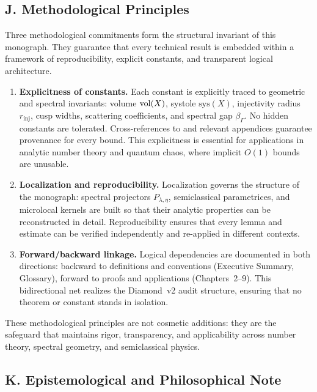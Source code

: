 \subsection*{J. Methodological Principles}

Three methodological commitments form the structural invariant of this monograph.
They guarantee that every technical result is embedded within a framework of
reproducibility, explicit constants, and transparent logical architecture.

\begin{enumerate}[label=\arabic*.]
  \item \textbf{Explicitness of constants.}
  Each constant is explicitly traced to geometric and spectral invariants:
  volume $\operatorname{vol}(X)$, systole $\mathrm{sys}(X)$, injectivity radius $r_{\mathrm{inj}}$,
  cusp widths, scattering coefficients, and spectral gap $\beta_\Gamma$.
  No hidden constants are tolerated.
  Cross-references to  and relevant appendices
  guarantee provenance for every bound.
  This explicitness is essential for applications in analytic number theory
  and quantum chaos, where implicit $O(1)$ bounds are unusable.

  \item \textbf{Localization and reproducibility.}
  Localization governs the structure of the monograph:
  spectral projectors $P_{\lambda,\eta}$, semiclassical parametrices,
  and microlocal kernels are built so that their analytic properties
  can be reconstructed in detail.
  Reproducibility ensures that every lemma and estimate can be verified independently
  and re-applied in different contexts.

  \item \textbf{Forward/backward linkage.}
  Logical dependencies are documented in both directions:
  backward to definitions and conventions (Executive Summary, Glossary),
  forward to proofs and applications (Chapters~2–9).
  This bidirectional net realizes the Diamond~v2 audit structure,
  ensuring that no theorem or constant stands in isolation.
\end{enumerate}

These methodological principles are not cosmetic additions:
they are the safeguard that maintains rigor, transparency,
and applicability across number theory, spectral geometry, and semiclassical physics.

\subsection*{K. Epistemological and Philosophical Note}

